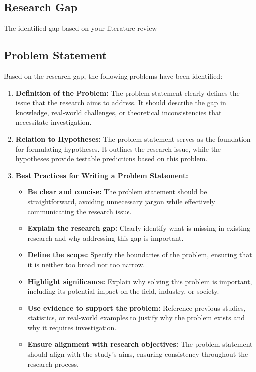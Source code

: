\subsection{Research Gap}

The identified gap based on your literature review


\subsection{Problem Statement}

Based on the research gap, the following problems have been identified:

\begin{enumerate}
    \item \textbf{Definition of the Problem:} The problem statement clearly defines the issue that the research aims to address. It should describe the gap in knowledge, real-world challenges, or theoretical inconsistencies that necessitate investigation.

    \item \textbf{Relation to Hypotheses:} The problem statement serves as the foundation for formulating hypotheses. It outlines the research issue, while the hypotheses provide testable predictions based on this problem.

    \item \textbf{Best Practices for Writing a Problem Statement:}
    \begin{itemize}
        \item \textbf{Be clear and concise:} The problem statement should be straightforward, avoiding unnecessary jargon while effectively communicating the research issue.
        \item \textbf{Explain the research gap:} Clearly identify what is missing in existing research and why addressing this gap is important.
        \item \textbf{Define the scope:} Specify the boundaries of the problem, ensuring that it is neither too broad nor too narrow.
        \item \textbf{Highlight significance:} Explain why solving this problem is important, including its potential impact on the field, industry, or society.
        \item \textbf{Use evidence to support the problem:} Reference previous studies, statistics, or real-world examples to justify why the problem exists and why it requires investigation.
        \item \textbf{Ensure alignment with research objectives:} The problem statement should align with the study’s aims, ensuring consistency throughout the research process.
    \end{itemize}
\end{enumerate}


